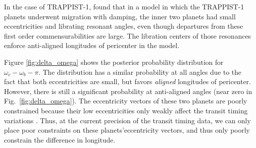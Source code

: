 \documentclass[twocolumn]{aastex63}
\begin{document}


In the case of TRAPPIST-1, \citet{Papaloizou2017} found that in a model
in which the TRAPPIST-1 planets underwent migration with damping, the
inner two planets had small eccentricities and librating resonant angles,
even though departures from these first order commensurabilities are
large.  The libration centers of those resonances enforce anti-aligned longitudes
of pericenter in the model.

Figure \ref{fig:delta_omega} shows the posterior probability distribution
for $\omega_c-\omega_b-\pi$.   The distribution has a similar probability
at all angles due to the fact that both eccentricities are small, but
favors {\it aligned} longitudes of pericenter.  However,
there is still a significant probability at anti-aligned angles (near
zero in Fig.\ \ref{fig:delta_omega}).   %
The eccentricity vectors of these two planets are poorly constrained because
their low eccentricities only weakly affect the transit timing variations \citep{Deck2016}.
Thus, at the current precision of the transit timing data, we can only place poor
constraints on these planets'eccentricity vectors, and thus only poorly constrain
the difference in longitude.
\end{document}

